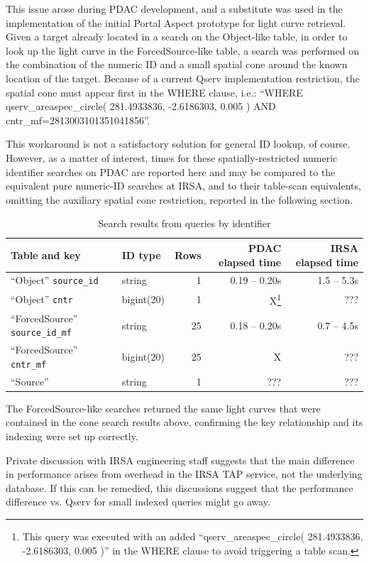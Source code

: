 \documentclass[DM,lsstdraft,STR,toc]{lsstdoc}
\begin{document}
This issue arose during PDAC development,
and a substitute was used in the implementation of the initial Portal Aspect prototype for light curve retrieval.
Given a target already located in a search on the Object-like table,
in order to look up the light curve in the ForcedSource-like table, 
a search was performed on the combination of the numeric ID and a small spatial cone around the known location of the target.
Because of a current Qserv implementation restriction,
the spatial cone must appear first in the WHERE clause, i.e.:
``WHERE qserv\_areaspec\_circle( 281.4933836, -2.6186303, 0.005 ) AND cntr\_mf=2813003101351041856''.

This workaround is not a satisfactory solution for general ID lookup, of course.
However, as a matter of interest,
times for these spatially-restricted numeric identifier searches on PDAC are reported here and may be compared to the equivalent pure numeric-ID searches at IRSA,
and to their table-scan equivalents, omitting the auxiliary spatial cone restriction,
reported in the following section.

\begin{table}[h]
\centering
\begin{tabular}{l l r r r}
Table and key & ID type & Rows & PDAC elapsed time & IRSA elapsed time \\ \hline
``Object'' \verb|source_id| & string & 1 & 0.19 -- 0.20s & 1.5 -- 5.3s \\
``Object'' \verb|cntr| & bigint(20) & 1 & X\footnote{This query was executed with an added ``qserv\_areaspec\_circle( 281.4933836, -2.6186303, 0.005 )'' in the WHERE clause to avoid triggering a table scan.\label{fn:id-no-table-scan}} & ??? \\
``ForcedSource'' \verb|source_id_mf| & string & 25 & 0.18 -- 0.20s & 0.7 -- 4.5s \\
``ForcedSource'' \verb|cntr_mf| & bigint(20) & 25 & X\footnotemark[4] & ??? \\
``Source'' & string & 1 & ??? & ??? \\
\end{tabular}
\caption{Search results from queries by identifier}
\label{tab:conesyntax}
\end{table}

The ForcedSource-like searches returned the same light curves that were contained in the cone search results above, confirming the key relationship and its indexing were set up correctly.

Private discussion with IRSA engineering staff suggests that the main difference in performance arises from overhead in the IRSA TAP service, not the underlying database.
If this can be remedied, this discussions suggest that the performance difference vs. Qserv for small indexed queries might go away.
\end{document}
